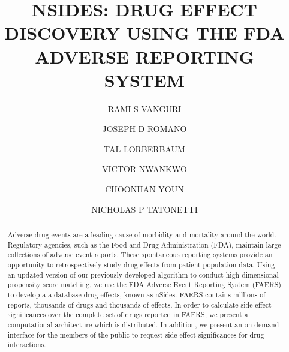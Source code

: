 \documentclass{ws-procs11x85}
\begin{document}
\title{NSIDES: DRUG EFFECT DISCOVERY USING THE FDA ADVERSE REPORTING SYSTEM}

\author{RAMI S VANGURI}

\address{Department of Biomedical Informatics, Columbia University,\\
New York, NY 10032 USA\\
E-mail: r.vanguri@columbia.edu}

\author{JOSEPH D ROMANO}

\address{Department of Biomedical Informatics, Columbia University,\\
New York, NY 10032 USA\\
E-mail: r.vanguri@columbia.edu}

\author{TAL LORBERBAUM}

\address{Department of Biomedical Informatics, Columbia University,\\
New York, NY 10032 USA\\
E-mail: r.vanguri@columbia.edu}

\author{VICTOR NWANKWO}

\address{Department of Biomedical Informatics, Columbia University,\\
New York, NY 10032 USA\\
E-mail: r.vanguri@columbia.edu}

\author{CHOONHAN YOUN}

\address{San Diego Supercomputer Center, University of California, San Diego,\\
La Jolla, CA 92093 USA\\
E-mail: cyoun@sdsc.edu}

\author{NICHOLAS P TATONETTI}

\address{Department of Biomedical Informatics, Columbia University,\\
New York, NY 10032 USA\\
E-mail: nick.tatonetti@columbia.edu}

\begin{abstract}
Adverse drug events are a leading cause of morbidity and mortality
around the world. Regulatory agencies, such as the Food and Drug
Administration (FDA), maintain large collections of adverse event
reports.  These spontaneous reporting systems provide an opportunity
to retrospectively study drug effects from patient population
data. Using an updated version of our previously developed algorithm
to conduct high dimensional propensity score matching, we use the FDA
Adverse Event Reporting System (FAERS) to develop a a database drug
effects, known as nSides. FAERS contains millions of reports,
thousands of drugs and thousands of effects.  In order to calculate
side effect significances over the complete set of drugs reported in
FAERS, we present a computational architecture which is distributed.
In addition, we present an on-demand interface for the members of the
public to request side effect significances for drug interactions.
\end{abstract}
\end{document}
